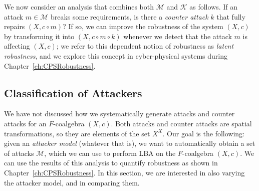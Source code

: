 We now consider an analysis that combines both $\mathcal{M}$ and $\mathcal{K}$ as follows. If an attack $m\in \mathcal{M}$ breaks some requirements, is there a \emph{counter attack} $k$ that fully repairs $(X,c\circ m)$? If so, we can improve the robustness of the system $(X,c)$ by transforming it into $(X,c\circ m \circ k)$ whenever we detect that the attack $m$ is affecting $(X,c)$; we refer to this dependent notion of robustness as \emph{latent robustness}, and we explore this concept in cyber-physical systems during Chapter~\ref{ch:CPSRobustness}.




\subsection{Classification of Attackers}
We have not discussed how we systematically generate attacks and counter attacks for an $F$-coalgebra $(X,c)$. Both attacks and counter attacks are spatial transformations, so they are elements of the set $X^X$. %
Our goal is the following: given an \emph{attacker model} (whatever that is), we want to automatically obtain a set of attacks $\mathcal{M}$, which we can use to perform LBA on the $F$-coalgebra $(X,c)$. We can use the results of this analysis to quantify robustness as shown in Chapter~\ref{ch:CPSRobustness}. In this section, we are interested in also varying the attacker model, and in comparing them.

